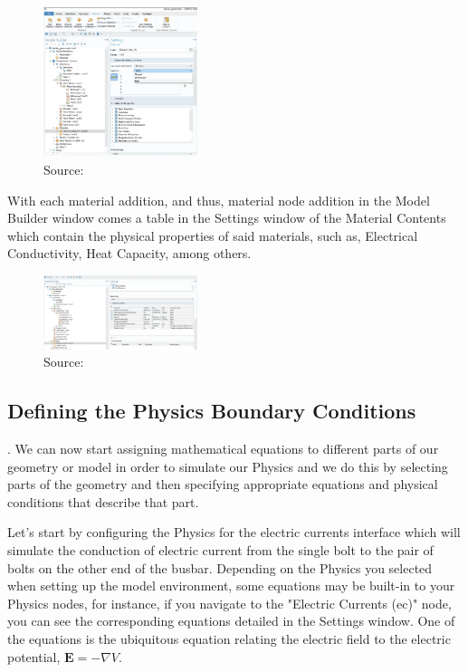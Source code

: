 \begin{figure}[ht!]
  \centering
  \includegraphics[width=0.4\textwidth]{Chapters/Figures/Chapter 3 Figures/Bolts Selection Choice.png}
  \caption{Source: \cite{}}
  \label{}
\end{figure}

With each material addition, and thus, material node addition in the Model Builder window comes a table in the Settings window of the Material Contents which contain the physical properties of said materials, such as, Electrical Conductivity, Heat Capacity, among others.

\begin{figure}[ht!]
  \centering
  \includegraphics[width=0.4\textwidth]{Chapters/Figures/Chapter 3 Figures/Material Contents in Settings Window.png}
  \caption{Source: \cite{}}
  \label{}
\end{figure}


\subsection{Defining the Physics Boundary Conditions}.
We can now start assigning mathematical equations to different parts of our geometry or model in order to simulate our Physics and we do this by selecting parts of the geometry and then specifying appropriate equations and physical conditions that describe that part.

Let's start by configuring the Physics for the electric currents interface which will simulate the conduction of electric current from the single bolt to the pair of bolts on the other end of the busbar. Depending on the Physics you selected when setting up the model environment, some equations may be built-in to your Physics nodes, for instance, if you navigate to the "Electric Currents (ec)" node, you can see the corresponding equations detailed in the Settings window. One of the equations is the ubiquitous equation relating the electric field to the electric potential, $\mathbf{E} = -\nabla V$.


